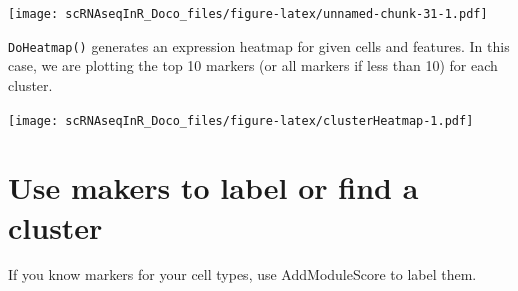 \documentclass[
]{book}
\newenvironment{Shaded}{\begin{snugshade}}{\end{snugshade}}
\newcommand{\AttributeTok}[1]{\textcolor[rgb]{0.13,0.29,0.53}{#1}}
\newcommand{\DecValTok}[1]{\textcolor[rgb]{0.00,0.00,0.81}{#1}}
\newcommand{\FunctionTok}[1]{\textcolor[rgb]{0.13,0.29,0.53}{\textbf{#1}}}
\newcommand{\NormalTok}[1]{#1}
\newcommand{\OtherTok}[1]{\textcolor[rgb]{0.56,0.35,0.01}{#1}}
\newcommand{\SpecialCharTok}[1]{\textcolor[rgb]{0.81,0.36,0.00}{\textbf{#1}}}
\begin{document}
\texttt{[image: scRNAseqInR\_Doco\_files/figure-latex/unnamed-chunk-31-1.pdf]}

\texttt{DoHeatmap()} generates an expression heatmap for given cells and features. In this case, we are plotting the top 10 markers (or all markers if less than 10) for each cluster.

\begin{Shaded}
\end{Shaded}

\texttt{[image: scRNAseqInR\_Doco\_files/figure-latex/clusterHeatmap-1.pdf]}

\hypertarget{use-makers-to-label-or-find-a-cluster}{%
\section{Use makers to label or find a cluster}\label{use-makers-to-label-or-find-a-cluster}}

If you know markers for your cell types, use AddModuleScore to label them.
\end{document}
